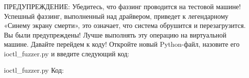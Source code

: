 \documentclass[12pt, a4paper, oneside]{book}
\begin{document}
ПРЕДУПРЕЖДЕНИЕ: Убедитесь, что фаззинг проводится на тестовой машине! Успешный фаззинг, выполненный над драйвером, приведет к легендарному «Синему экрану смерти», это означает, что система обрушится и перезагрузится. Вы были предупреждены! Лучше выполнять эту операцию на виртуальной машине.
Давайте перейдем к коду! Откройте новый Python-файл, назовите его ioctl\_fuzzer.py и введите следующий код:

ioctl\_fuzzer.py
Код:

    


        
        
        
        
        



\end{document}
